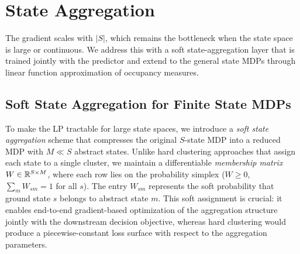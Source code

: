 \section{State Aggregation}
\label{sec:agg}
The \LP gradient scales with $|S|$, which remains the bottleneck when the state space is large or continuous. We address this with a soft state-aggregation layer that is trained jointly with the predictor and extend to the general state MDPs through linear function approximation of occupancy measures.

\subsection{Soft State Aggregation for Finite State MDPs}
To make the LP tractable for large state spaces, we introduce a \emph{soft state aggregation} scheme that compresses the original $S$-state MDP into a reduced MDP with $M \ll S$ abstract states. Unlike hard clustering approaches that assign each state to a single cluster, we maintain a differentiable \emph{membership matrix} $W \in \mathbb{R}^{S \times M}$, where each row lies on the probability simplex ($W \geq 0$, $\sum_m W_{sm} = 1$ for all $s$). The entry $W_{sm}$ represents the soft probability that ground state $s$ belongs to abstract state $m$. This soft assignment is crucial: it enables end-to-end gradient-based optimization of the aggregation structure jointly with the downstream decision objective, whereas hard clustering would produce a piecewise-constant loss surface with respect to the aggregation parameters.

